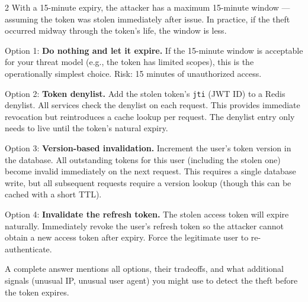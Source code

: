 \documentclass[11pt,a4paper]{article}
\begin{document}
\begin{answerbox}{2}
With a 15-minute expiry, the attacker has a maximum 15-minute window --- assuming the token was stolen immediately after issue. In practice, if the theft occurred midway through the token's life, the window is less.

Option 1: \textbf{Do nothing and let it expire.} If the 15-minute window is acceptable for your threat model (e.g., the token has limited scopes), this is the operationally simplest choice. Risk: 15 minutes of unauthorized access.

Option 2: \textbf{Token denylist.} Add the stolen token's \texttt{jti} (JWT ID) to a Redis denylist. All services check the denylist on each request. This provides immediate revocation but reintroduces a cache lookup per request. The denylist entry only needs to live until the token's natural expiry.

Option 3: \textbf{Version-based invalidation.} Increment the user's token version in the database. All outstanding tokens for this user (including the stolen one) become invalid immediately on the next request. This requires a single database write, but all subsequent requests require a version lookup (though this can be cached with a short TTL).

Option 4: \textbf{Invalidate the refresh token.} The stolen access token will expire naturally. Immediately revoke the user's refresh token so the attacker cannot obtain a new access token after expiry. Force the legitimate user to re-authenticate.

A complete answer mentions all options, their tradeoffs, and what additional signals (unusual IP, unusual user agent) you might use to detect the theft before the token expires.
\end{answerbox}

\vspace{0.4cm}
\end{document}
